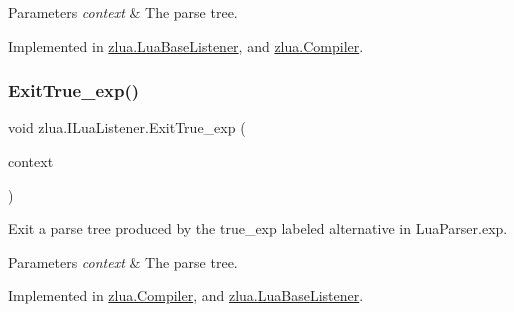 \begin{DoxyParams}{Parameters}
{\em context} & The parse tree.\\
\hline
\end{DoxyParams}


Implemented in \mbox{\hyperlink{classzlua_1_1_lua_base_listener_aa0a2a4e40e4246abaddc0bbe731748c6}{zlua.\+Lua\+Base\+Listener}}, and \mbox{\hyperlink{classzlua_1_1_compiler_a9169c6cb5853ae3dca1399bf9d99e6d0}{zlua.\+Compiler}}.

\mbox{\label{interfacezlua_1_1_i_lua_listener_a9d5a4a9bd56969dc9b5269fd3049187d}} 
\subsubsection{\texorpdfstring{Exit\+True\+\_\+exp()}{ExitTrue\_exp()}}
{\footnotesize\ttfamily void zlua.\+I\+Lua\+Listener.\+Exit\+True\+\_\+exp (\begin{DoxyParamCaption}\item[{\mbox{[}\+Not\+Null\mbox{]} \mbox{\hyperlink{classzlua_1_1_lua_parser_1_1_true__exp_context}{Lua\+Parser.\+True\+\_\+exp\+Context}}}]{context }\end{DoxyParamCaption})}



Exit a parse tree produced by the {\ttfamily true\+\_\+exp} labeled alternative in Lua\+Parser.\+exp. 


\begin{DoxyParams}{Parameters}
{\em context} & The parse tree.\\
\hline
\end{DoxyParams}


Implemented in \mbox{\hyperlink{classzlua_1_1_compiler_a4f3853e4033fb51cb2d9c63cdd66e1ae}{zlua.\+Compiler}}, and \mbox{\hyperlink{classzlua_1_1_lua_base_listener_a1f4f2a7162ad93c54ae0c86a15233bac}{zlua.\+Lua\+Base\+Listener}}.

\mbox{\label{interfacezlua_1_1_i_lua_listener_ab0371ff8288b99ae8fe05ccba2980ee2}} 
